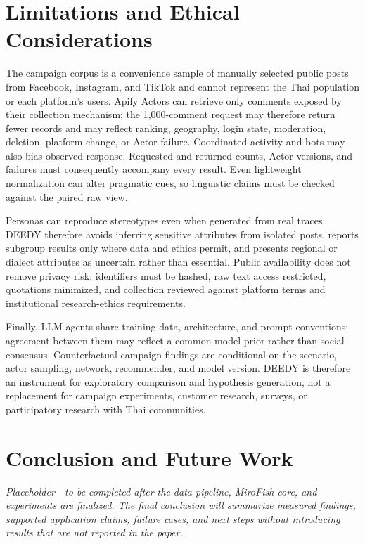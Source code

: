 \documentclass[conference]{IEEEtran}
\begin{document}
\section{Limitations and Ethical Considerations}

The campaign corpus is a convenience sample of manually selected public posts
from Facebook, Instagram, and TikTok and cannot represent the Thai population
or each platform's users. Apify Actors can retrieve only comments exposed by
their collection mechanism; the 1,000-comment request may therefore return
fewer records and may reflect ranking, geography, login state, moderation,
deletion, platform change, or Actor failure. Coordinated activity and bots may
also bias observed response. Requested and returned counts, Actor versions,
and failures must consequently accompany every result. Even lightweight
normalization can alter pragmatic cues, so linguistic claims must be checked
against the paired raw view.

Personas can reproduce stereotypes even when generated from real traces.
DEEDY therefore avoids inferring sensitive attributes from isolated posts,
reports subgroup results only where data and ethics permit, and presents
regional or dialect attributes as uncertain rather than essential. Public
availability does not remove privacy risk: identifiers must be hashed, raw
text access restricted, quotations minimized, and collection reviewed against
platform terms and institutional research-ethics requirements.

Finally, LLM agents share training data, architecture, and prompt conventions;
agreement between them may reflect a common model prior rather than social
consensus. Counterfactual campaign findings are conditional on the scenario,
actor sampling, network, recommender, and model version. DEEDY is therefore an
instrument for exploratory comparison and hypothesis generation, not a
replacement for campaign experiments, customer research, surveys, or
participatory research with Thai communities.

\section{Conclusion and Future Work}

\emph{Placeholder---to be completed after the data pipeline, MiroFish core,
and experiments are finalized. The final conclusion will summarize measured
findings, supported application claims, failure cases, and next steps without
introducing results that are not reported in the paper.}



\end{document}
